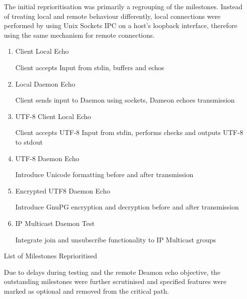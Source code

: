 The initial reprioritisation was primarily a regrouping of the
milestones. Instead of treating local and remote behaviour differently,
local connections were performed by using Unix Sockets IPC on a host's
loopback interface, therefore using the same mechanism for remote
connections.

\begin{table}[Hbt]

\begin{center}

\begin{enumerate}

\item Client Local Echo 

	\subitem Client accepts Input from stdin, buffers and echos

\item Local Daemon Echo 

	\subitem Client sends input to Daemon using sockets, Dameon 
	echoes transmission

\item UTF-8 Client Local Echo 

	\subitem Client accepts UTF-8 Input from stdin, performs checks and
	outputs UTF-8 to stdout

\item UTF-8 Daemon Echo

	\subitem Introduce Unicode formatting before and after transmission 

\item Encrypted UTF8 Daemon Echo 

	\subitem Introduce GnuPG encryption and decryption before and after 
	transmission 

\item IP Multicast Daemon Test

	\subitem Integrate join and unsubscribe functionality to IP Multicast
	groups

\end{enumerate}

\end{center}

\caption{List of Milestones Reprioritised}

\end{table}


Due to delays during testing and the remote Deamon echo objective, the 
outstanding milestones were further scrutinised and specified features
were marked as optional and removed from the critical path.


